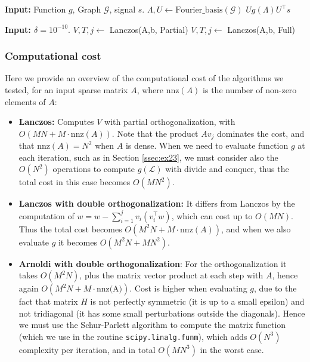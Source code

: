 \documentclass[11pt]{article}
\newcommand{\G}{\mathcal{G}}
\renewcommand{\L}{\mathcal{L}}
\theoremstyle{definition}
\theoremstyle{remark}
\theoremstyle{experimental}
\begin{document}
\begin{algorithm}[ht!]
  \caption{Evaluation of $ g(\L)s $ using Fourier basis.}
  \label{alg:g_evaluation_fourier}
  \begin{algorithmic}[1]
    \State \textbf{Input:} Function $ g $, Graph $ \G $, signal $ s $.
    \State $ \Lambda,U \leftarrow \text{Fourier\_basis}( \G )$
    \State \Return $ U g(\Lambda) U^{\top}s $
  \end{algorithmic}
  
\end{algorithm}

\begin{algorithm}[ht!]
  \caption{Orthogonalization selection.}
  \label{alg:orthosel}
  \begin{algorithmic}[1]
    \State \textbf{Input: $\delta = 10^{-10}$}.
    \State $V, T, j \leftarrow $ Lanczos(A,b, Partial)
    \State $ V, T,j \leftarrow $ Lanczos(A,b, Full)
      \EndIf
  \end{algorithmic}
\end{algorithm}




\subsubsection{Computational cost}
\label{ssec:cost}

Here we provide an overview of the computational cost of the algorithms we tested, for an input sparse matrix $ A $, where $ \text{nnz}(A) $ is the number of non-zero elements of $ A $:

\begin{itemize}
  \item \textbf{Lanczos:} Computes $ V $  with partial orthogonalization, with $ O(M  N
  + M \cdot \text{nnz}(A)) $. Note that the product $ Av_j $ dominates the cost,
  and that $ \text{nnz}(A) = N^2 $ when $ A $ is dense. When we need to evaluate function $ g $ at
  each iteration, such as in Section \ref{ssec:ex23}, we must consider also the $ O(N^2) $
  operations to compute $ g(\L) $ with divide and conquer, thus the total cost in this case becomes $ O(M N^2) $.
\item \textbf{Lanczos with double orthogonalization:} It differs from Lanczos by the
  computation of $ w = w -
  \sum_{i=1}^j v_i(v_i^{\top}w) $, which can cost up
  to $ O(M N) $. Thus the total cost becomes $ O(M^2N +  M\cdot \text{nnz}(A)) $, and when we
  also evaluate $ g $ it becomes $ O(M^2N + MN^2) $.
\item \textbf{Arnoldi with double orthogonalization}: For the orthogonalization it takes $ O(M^2N)
  $, plus the matrix vector product at each step with $ A $, hence again $ O(M^2N + M \cdot
  \text{nnz(A)}) $. Cost is higher when evaluating $ g $, due to the fact that matrix $ H $ is not
  perfectly symmetric (it is up to a small epsilon) and not tridiagonal (it has some small
  perturbations outside the diagonals). Hence we must use the Schur-Parlett algorithm to compute the matrix function
  (which we use in the routine \texttt{scipy.linalg.funm}), which adds $ O(N^3)$ complexity per
  iteration, and in total $ O(MN^3) $ in the worst case.
 \end{itemize}
\end{document}
